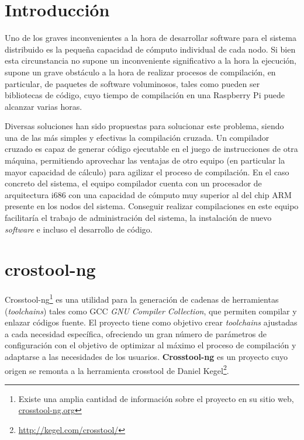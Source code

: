 \documentclass{article}
\title{\hmwkTitle}
\author{\textbf{\hmwkAuthorName}}
\date{21 de abril de 2015}
\begin{document}
\maketitle


\setcounter{tocdepth}{1}

\newpage
\tableofcontents
\newpage


\section{Introducción}

Uno de los graves inconvenientes a la hora de desarrollar software para el sistema distribuido es la pequeña capacidad de cómputo individual de cada nodo. Si bien esta circunstancia no supone un inconveniente significativo a la hora la ejecución, supone un grave obstáculo a la hora de realizar procesos de compilación, en particular, de paquetes de software voluminosos, tales como pueden ser bibliotecas de código, cuyo tiempo de compilación en una Raspberry Pi puede alcanzar varias horas.

Diversas soluciones han sido propuestas para solucionar este problema, siendo una de las más simples y efectivas la compilación cruzada. Un compilador cruzado es capaz de generar código ejecutable en el juego de instrucciones de otra máquina, permitiendo aprovechar las ventajas de otro equipo (en particular la mayor capacidad de cálculo) para agilizar el proceso de compilación. En el caso concreto del sistema, el equipo compilador cuenta con un procesador de arquitectura i686 con una capacidad de cómputo muy superior al del chip ARM presente en los nodos del sistema. Conseguir realizar compilaciones en este equipo facilitaría el trabajo de administración del sistema, la instalación de nuevo \textit{software} e incluso el desarrollo de código.

\section{crostool-ng}

Crosstool-ng\footnote{Existe una amplia cantidad de información sobre el proyecto en su sitio web, \href{http://crosstool-ng.org/}{crosstool-ng.org}} es una utilidad para la generación de cadenas de herramientas (\textit{toolchains}) tales como GCC \textit{GNU Compiler Collection}, que permiten compilar y enlazar códigos fuente. El proyecto tiene como objetivo crear \textit{toolchains} ajustadas a cada necesidad específica, ofreciendo un gran número de parámetros de configuración con el objetivo de optimizar al máximo el proceso de compilación y adaptarse a las necesidades de los usuarios. \textbf{Crosstool-ng} es un proyecto cuyo origen se remonta a la herramienta crosstool de Daniel Kegel\footnote{\href{http://kegel.com/crosstool/}{http://kegel.com/crosstool/}}.
\end{document}
